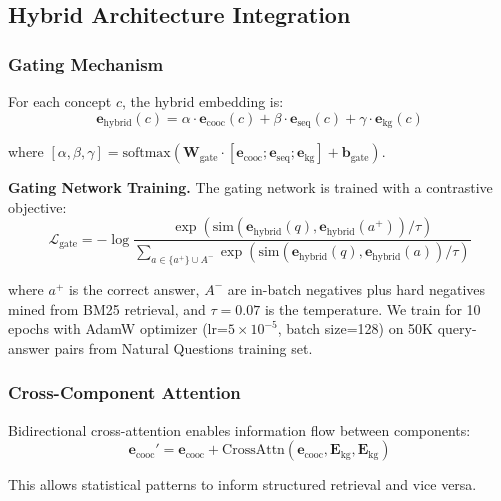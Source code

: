 \documentclass[conference]{IEEEtran}
\begin{document}
\subsection{Hybrid Architecture Integration}

\subsubsection{Gating Mechanism}
\label{sec:gating}

For each concept $c$, the hybrid embedding is:
\begin{equation}
\mathbf{e}_{\text{hybrid}}(c) = \alpha \cdot \mathbf{e}_{\text{cooc}}(c) + \beta \cdot \mathbf{e}_{\text{seq}}(c) + \gamma \cdot \mathbf{e}_{\text{kg}}(c)
\end{equation}

where $[\alpha, \beta, \gamma] = \text{softmax}(\mathbf{W}_{\text{gate}} \cdot [\mathbf{e}_{\text{cooc}}; \mathbf{e}_{\text{seq}}; \mathbf{e}_{\text{kg}}] + \mathbf{b}_{\text{gate}})$.

\textbf{Gating Network Training.} The gating network is trained with a contrastive objective:
\begin{equation}
\mathcal{L}_{\text{gate}} = -\log \frac{\exp(\text{sim}(\mathbf{e}_{\text{hybrid}}(q), \mathbf{e}_{\text{hybrid}}(a^+)) / \tau)}{\sum_{a \in \{a^+\} \cup A^-} \exp(\text{sim}(\mathbf{e}_{\text{hybrid}}(q), \mathbf{e}_{\text{hybrid}}(a)) / \tau)}
\end{equation}

where $a^+$ is the correct answer, $A^-$ are in-batch negatives plus hard negatives mined from BM25 retrieval, and $\tau = 0.07$ is the temperature. We train for 10 epochs with AdamW optimizer (lr=$5 \times 10^{-5}$, batch size=128) on 50K query-answer pairs from Natural Questions training set.

\subsubsection{Cross-Component Attention}
\label{sec:cross_attention}

Bidirectional cross-attention enables information flow between components:
\begin{equation}
\mathbf{e}_{\text{cooc}}' = \mathbf{e}_{\text{cooc}} + \text{CrossAttn}(\mathbf{e}_{\text{cooc}}, \mathbf{E}_{\text{kg}}, \mathbf{E}_{\text{kg}})
\end{equation}

This allows statistical patterns to inform structured retrieval and vice versa.
\end{document}
